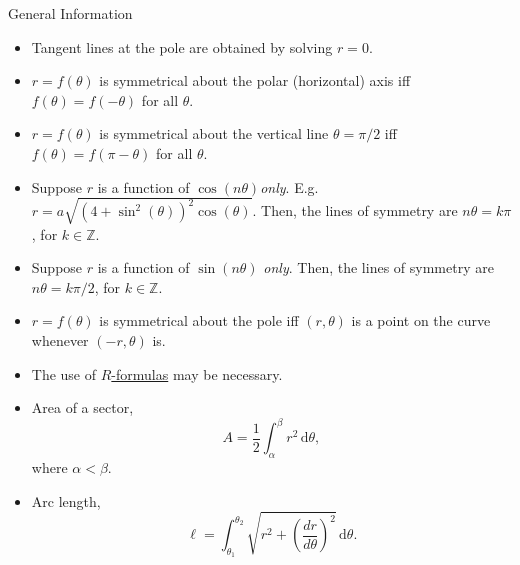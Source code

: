 \documentclass[oneside]{book}
\begin{document}
\begin{stbox}{General Information}{}
\begin{itemize}[label=\(\circ\)]
\begin{longtable}{|Sc|Sc|Sc|}
\begin{tabular}{@{}Sc@{}}
\end{tabular}& \(x^2+\left(y-\dfrac{a}{2}\right)^2=\dfrac{a^2}{4}\)\\
\hline
    \end{longtable}
    \item Tangent lines at the pole are obtained by solving \(r=0\).
    \item \(r=f(\theta)\) is symmetrical about the polar (horizontal) axis iff \(f(\theta)=f(-\theta)\) for all \(\theta\).
    \item \(r=f(\theta)\) is symmetrical about the vertical line \(\theta=\pi/2\) iff \(f(\theta)=f(\pi-\theta)\) for all \(\theta\).
    \item Suppose \(r\) is a function of \(\cos(n\theta)\)\emph{only}. E.g. \(r=a\sqrt{(4+\sin^2(\theta))^2\cos(\theta)}\). Then, the lines of symmetry are \(n\theta=k\pi\), for \(k\in \mathbb{Z}\).
    \item Suppose \(r\) is a function of \(\sin(n\theta)\) \emph{only}. Then, the lines of symmetry are \(n\theta=k\pi/2\), for \(k\in \mathbb{Z}\).
    \item \(r=f(\theta)\) is symmetrical about the pole iff \((r,\theta)\) is a point on the curve whenever \((-r,\theta)\) is.
    \item The use of \hyperlink{R-formulas}{\(R\)-formulas} may be necessary.
    \item Area of a sector, 
    \[A=\dfrac{1}{2}\int_{\alpha}^{\beta}r^2\,\text{d}\theta,\] 
    where \(\alpha<\beta\).
    \item Arc length, 
    \[\ell=\int_{\theta_1}^{\theta_2} \sqrt{r^2+\left(\frac{dr}{d\theta}\right)^2}\,\text{d}\theta.\]
  \end{itemize}
\end{stbox}
\end{document}
